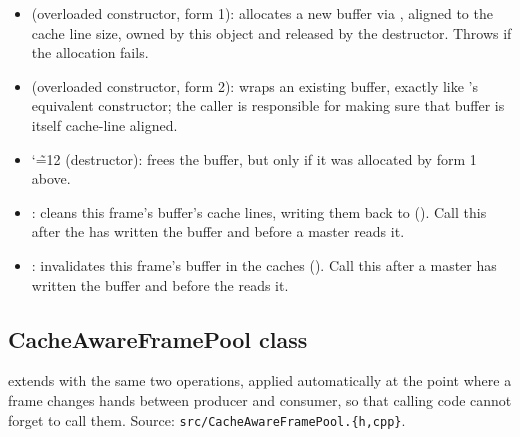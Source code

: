 \begin{itemize}
    \item {} (overloaded constructor, form 1): allocates a new buffer via , aligned to the cache line size, owned by this object and released by the destructor. Throws  if the allocation fails.
    \item {} (overloaded constructor, form 2): wraps an existing buffer, exactly like 's equivalent constructor; the caller is responsible for making sure that buffer is itself cache-line aligned.
    \item {\catcode`\~=12 } (destructor): frees the buffer, but only if it was allocated by form 1 above.
    \item {}: cleans this frame's buffer's cache lines, writing them back to  (). Call this after the  has written the buffer and before a  master reads it.
    \item {}: invalidates this frame's buffer in the  caches (). Call this after a  master has written the buffer and before the  reads it.
\end{itemize}

\subsection{CacheAwareFramePool class}
\label{subsec:fpgasteel-cache-aware-framepool}

 extends  with the same two operations, applied automatically at the point where a frame changes hands between producer and consumer, so that calling code cannot forget to call them. Source: \lstinline[style=inlineFsRepo]!src/CacheAwareFramePool.{h,cpp}!.

